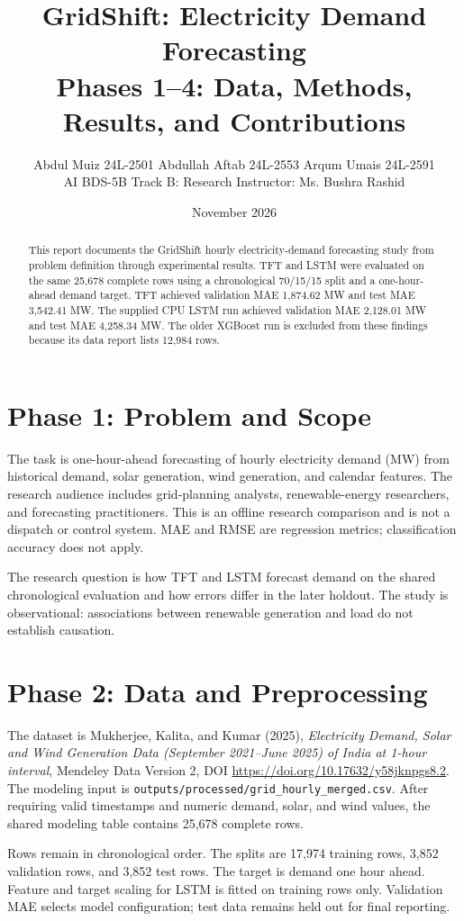 \documentclass[11pt,a4paper]{article}
\title{\textbf{GridShift: Electricity Demand Forecasting}\\\large Phases 1--4: Data, Methods, Results, and Contributions}
\author{Abdul Muiz 24L-2501 \textbar{} Abdullah Aftab 24L-2553 \textbar{} Arqum Umais 24L-2591\\AI BDS-5B \textbar{} Track B: Research \textbar{} Instructor: Ms. Bushra Rashid}
\date{November 2026}
\begin{document}
\maketitle
\begin{abstract}
This report documents the GridShift hourly electricity-demand forecasting study from problem definition through experimental results. TFT and LSTM were evaluated on the same 25,678 complete rows using a chronological 70/15/15 split and a one-hour-ahead demand target. TFT achieved validation MAE 1,874.62 MW and test MAE 3,542.41 MW. The supplied CPU LSTM run achieved validation MAE 2,128.01 MW and test MAE 4,258.34 MW. The older XGBoost run is excluded from these findings because its data report lists 12,984 rows. 
\end{abstract}
\section{Phase 1: Problem and Scope}
The task is one-hour-ahead forecasting of hourly electricity demand (MW) from historical demand, solar generation, wind generation, and calendar features. The research audience includes grid-planning analysts, renewable-energy researchers, and forecasting practitioners. This is an offline research comparison and is not a dispatch or control system. MAE and RMSE are regression metrics; classification accuracy does not apply.

The research question is how TFT and LSTM forecast demand on the shared chronological evaluation and how errors differ in the later holdout. The study is observational: associations between renewable generation and load do not establish causation.
\section{Phase 2: Data and Preprocessing}
The dataset is Mukherjee, Kalita, and Kumar (2025), \textit{Electricity Demand, Solar and Wind Generation Data (September 2021--June 2025) of India at 1-hour interval}, Mendeley Data Version 2, DOI \url{https://doi.org/10.17632/y58jknpgs8.2}. The modeling input is \texttt{outputs/processed/grid\_hourly\_merged.csv}. After requiring valid timestamps and numeric demand, solar, and wind values, the shared modeling table contains 25,678 complete rows.

Rows remain in chronological order. The splits are 17,974 training rows, 3,852 validation rows, and 3,852 test rows. The target is demand one hour ahead. Feature and target scaling for LSTM is fitted on training rows only. Validation MAE selects model configuration; test data remains held out for final reporting.
\end{document}
